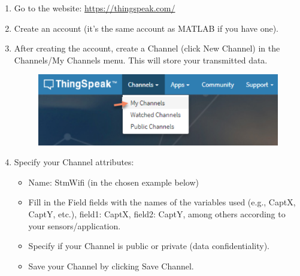 \documentclass[10pt,a4paper,onecolumn]{article}
\providecommand{\tightlist}{%
  \setlength{\itemsep}{0pt}\setlength{\parskip}{0pt}}
\begin{document}
\begin{enumerate}
\def\labelenumi{\arabic{enumi}.}
\item
  Go to the website:
  \url{https://thingspeak.com/}
\item
  Create an account (it's the same account as MATLAB if you have one).
\item
  After creating the account, create a Channel (click New Channel) in the Channels/My Channels menu. This will store your transmitted data.

  \begin{figure}[H]
    \begin{center}
      \includegraphics[width=\dimexpr\textwidth-1cm\relax,height=\dimexpr0.25\textheight-4cm\relax,keepaspectratio]{images/25.png}
    \end{center}
  \end{figure}

\item
  Specify your Channel attributes:

  \begin{itemize}
  \tightlist
  \item
    Name: StmWifi (in the chosen example below)
  \item
    Fill in the Field fields with the names of the variables used (e.g.,
    CaptX, CaptY, etc.), field1: CaptX, field2: CaptY, among others
    according to your sensors/application.
  \item
    Specify if your Channel is public or private (data confidentiality).
  \item
    Save your Channel by clicking Save Channel.


\end{itemize}
\end{enumerate}
\end{document}
